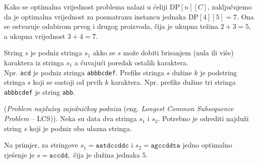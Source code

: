 Kako se optimalna vrijednost problema nalazi u ćeliji $\textrm{DP}[n][C]$, zaključujemo da je optimalna vrijednost za posmatranu instancu jednaka $\textrm{DP}[4][5]=7.$  Ona se ostvaruje odabirom prvog i drugog proizvoda, čija je ukupna težina $2+3=5$, a ukupna vrijednost $3+4=7$.

 \begin{definition}
 	String $s$ je podniz stringa $s_1$ akko se $s$ može dobiti brisanjem (nula ili više)
 	karaktera iz stringa $s_1$ a čuvajući poredak ostalih karaktera. \\
 	Npr.  \texttt{acd} je podniz stringa \texttt{abbbcdef}.   Prefiks stringa $s$ dužine $k$ je podstring stringa $s$ koji se sastoji od prvih $k$ karaktera. Npr. prefiks dužine tri stringa \texttt{abbbcdef} je string \texttt{abb}. 
 	
 \end{definition}
 
\begin{example}
	(\textit{Problem najdužeg zajedničkog podniza} (eng. \emph{Longest Common Subsequence Problem} -- LCS)). Neka su data dva stringa $s_1$ i $s_2$. Potrebno je odrediti najduži string $s$ koji je podniz oba ulazna stringa.
	
	Na primjer, za stringove $s_1=\texttt{aatdccddc}$ i 
	$s_2=\texttt{agccddta} $
	jedno optimalno rješenje je $s=\texttt{accdd},$
	čija je dužina jednaka $5$.
\end{example}

